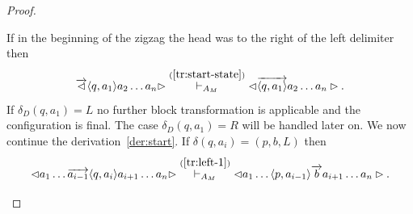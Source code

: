 \documentclass[pre,showpacs,showkeys,preprint]{revtex4}
\theoremstyle{definition}
\begin{document}
\begin{proof}
\begin{enumerate}
If in the beginning of the zigzag the head was to the right of the left delimiter then
\begin{equation}
\overrightarrow{\lhd} \langle q,a_1 \rangle a_{2} \ldots a_n \rhd
\stackrel{(\ref{tr:start-state})}{\vdash_{A_M}}
\lhd \overrightarrow{\langle q,a_1 \rangle} a_{2} \ldots a_n \rhd.
\end{equation}
If $\delta_D(q,a_1)=L$ no further block transformation is applicable and the configuration is final.
The case $\delta_D(q,a_1)=R$ will be handled later on.
We now continue the derivation~\ref{der:start}.
If $\delta(q,a_i) = (p, b, L)$ then
\begin{equation}
\lhd  a_1 \ldots \overrightarrow{a_{i-1}} \langle q,a_i \rangle a_{i+1} \ldots a_n \rhd
\stackrel{(\ref{tr:left-1})}{\vdash_{A_M}}
\lhd  a_1 \ldots \langle p,a_{i-1} \rangle \overrightarrow{b}  a_{i+1} \ldots a_n \rhd.
\label{der:tm-step-left}
\end{equation}


\end{enumerate}
\end{proof}
\end{document}
